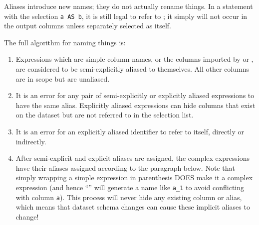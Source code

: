 \documentclass{article}
\begin{document}
Aliases introduce new names; they do not actually rename things.  In a
statement with the selection \lstinline|a AS b|, it is still legal to
refer to ; it simply will not occur in the output columns
unless separately selected as itself.

The full algorithm for naming things is:
\begin{enumerate}
\item Expressions which are simple column-names, or the columns
  imported by \code{*} or \code{:*}, are considered to be
  semi-explicitly aliased to themselves.  All other columns are in
  scope but are unaliased.
\item It is an error for any pair of semi-explicitly or explicitly
  aliased expressions to have the same alias.  Explicitly aliased
  expressions can hide columns that exist on the dataset but are not
  referred to in the selection list.
\item It is an error for an explicitly aliased identifier to refer to
  itself, directly or indirectly.
\item After semi-explicit and explicit aliases are assigned, the
  complex expressions have their aliases assigned according to the
  paragraph below.  Note that simply wrapping a simple expression in
  parenthesis DOES make it a complex expression (and hence
  ``'' will generate a name like \lstinline|a_1| to avoid
  conflicting with column \lstinline|a|).  This process will never
  hide any existing column or alias, which means that dataset schema
  changes can cause these implicit aliases to change!
\end{enumerate}
\end{document}
